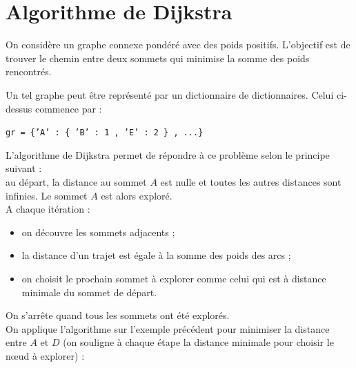 \section{Algorithme de Dijkstra}

On considère un graphe connexe pondéré avec des poids positifs. L'objectif est de trouver le chemin entre deux sommets qui minimise la somme des poids rencontrés. 

\begin{center}
\end{center}

Un tel graphe peut être représenté par un dictionnaire de dictionnaires. Celui ci-dessus commence par :
\begin{center}
\texttt{gr = \{'A' : \{ 'B' : 1 , 'E' : 2  \} , ...\}}
\end{center}

L'algorithme de Dijkstra permet de répondre à ce problème selon le principe suivant :\\
au départ, la distance au sommet $A$ est nulle et toutes les autres distances sont infinies. Le sommet $A$ est alors exploré.\\
A chaque itération : 
\begin{itemize}
\item on découvre les sommets adjacents ;
\item la distance d'un trajet est égale à la somme des poids des arcs ;
\item on choisit le prochain sommet à explorer comme celui qui est à distance minimale du sommet de départ.
\end{itemize}
On s'arrête quand tous les sommets ont été explorés.\\

On applique l'algorithme sur l'exemple précédent pour minimiser la distance entre $A$ et $D$ (on souligne à chaque étape la distance minimale pour choisir le n\oe ud à explorer) :

